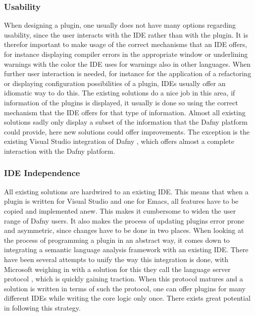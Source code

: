 \subsubsection{Usability}
When designing a plugin, one usually does not have many options regarding usability, since the user interacts with the IDE rather than with the plugin. It is therefor important to make usage of the correct mechanisms that an IDE offers, for instance displaying compiler errors in the appropriate window or underlining warnings with the color the IDE uses for warnings also in other languages. When further user interaction is needed, for instance for the application of a refactoring or displaying configuration possibilities of a plugin, IDEs usually offer an idiomatic way to do this.  \newline
The existing solutions do a nice job in this area, if information of the plugins is displayed, it usually is done so using the correct mechanism that the IDE offers for that type of information. Almost all existing solutions sadly only display a subset of the information that the Dafny platform could provide, here new solutions could offer improvements. The exception is the existing Visual Studio integration of Dafny \cite{visualstudiodafny}, which offers almost a complete interaction with the Dafny platform. 
\subsubsection{IDE Independence}
All existing solutions are hardwired to an existing IDE. This means that when a plugin is written for Visual Studio and one for Emacs, all features have to be copied and implemented anew. This makes it cumbersome to widen the user range of Dafny users. It also makes the process of updating plugins error prone and asymmetric, since changes have to be done in two places. \newline
When looking at the process of programming a plugin in an abstract way, it comes down to integrating a semantic language analysis framework with an existing IDE. There have been several attempts to unify the way this integration is done, with Microsoft weighing in with a solution for this they call the language server protocol \cite{langserver}, which is quickly gaining traction. When this protocol matures and a solution is written in terms of such the protocol, one can offer plugins for many different IDEs while writing the core logic only once. There exists great potential in following this strategy. 
